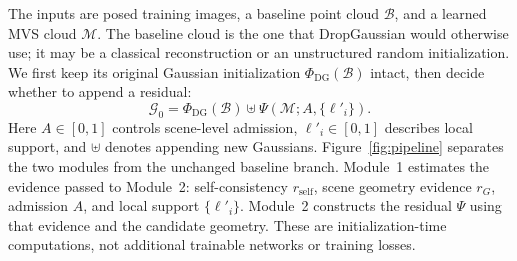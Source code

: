 \documentclass{article}
\newcommand{\rself}{r_{\mathrm{self}}}
\newcommand{\PhiDG}{\Phi_{\mathrm{DG}}}
\begin{document}
The inputs are posed training images, a baseline point cloud $\mathcal B$, and a learned MVS cloud $\mathcal M$. The baseline cloud is the one that DropGaussian would otherwise use; it may be a classical reconstruction or an unstructured random initialization. We first keep its original Gaussian initialization $\PhiDG(\mathcal B)$ intact, then decide whether to append a residual:
\begin{equation}
\mathcal G_0=\PhiDG(\mathcal B)\uplus\Psi(\mathcal M;A,\{\ell'_i\}).
\label{eq:residual}
\end{equation}
Here $A\in[0,1]$ controls scene-level admission, $\ell'_i\in[0,1]$ describes local support, and $\uplus$ denotes appending new Gaussians. Figure~\ref{fig:pipeline} separates the two modules from the unchanged baseline branch. Module~1 estimates the evidence passed to Module~2: self-consistency $\rself$, scene geometry evidence $r_G$, admission $A$, and local support $\{\ell'_i\}$. Module~2 constructs the residual $\Psi$ using that evidence and the candidate geometry. These are initialization-time computations, not additional trainable networks or training losses.
\end{document}
